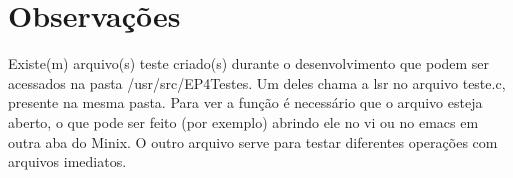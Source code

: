 \documentclass[11pt]{article}
\begin{document}
    \section*{Observações}
    Existe(m) arquivo(s) teste criado(s) durante o desenvolvimento que podem ser acessados na pasta /usr/src/EP4\-Testes. Um deles chama a lsr no arquivo teste.c, presente na mesma pasta. Para ver a função é necessário que o arquivo esteja aberto, o que pode ser feito (por exemplo) abrindo ele no vi ou no emacs em outra aba do Minix. O outro arquivo serve para testar diferentes operações com arquivos imediatos.
\end{document}
